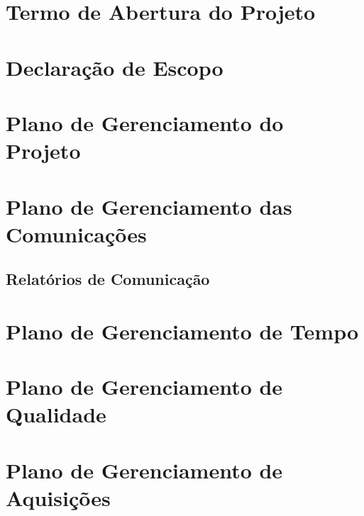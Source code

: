 \begin{anexosenv}

\partanexos

\chapter{Termo de Abertura do Projeto}

  
  
\chapter{Declaração de Escopo}

  

\chapter{Plano de Gerenciamento do Projeto}

  
  
\chapter{Plano de Gerenciamento das Comunicações}

  
	  \pagebreak
  	\section{Relatórios de Comunicação}
  		

\chapter{Plano de Gerenciamento de Tempo}

  

\chapter{Plano de Gerenciamento de Qualidade}

  
  
\chapter{Plano de Gerenciamento de Aquisições}


\end{anexosenv}

